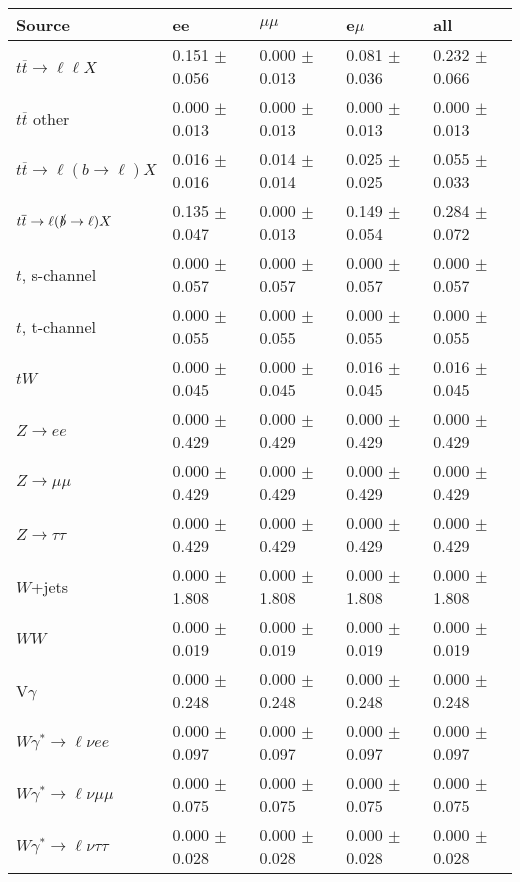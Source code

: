 \begin{tabular}{l | l l l l}
\hline\hline
 Source  &  ee  &  $\mu\mu$  &  e$\mu$  &  all \\
\hline
$t\overline{t}\rightarrow \ell\ell X$ &  0.151 $\pm$  0.056 &  0.000 $\pm$  0.013 &  0.081 $\pm$  0.036 &  0.232 $\pm$  0.066\\
$t\overline{t}$ other &  0.000 $\pm$  0.013 &  0.000 $\pm$  0.013 &  0.000 $\pm$  0.013 &  0.000 $\pm$  0.013\\
$t\overline{t}\rightarrow \ell(b\rightarrow \ell)X$ &  0.016 $\pm$  0.016 &  0.014 $\pm$  0.014 &  0.025 $\pm$  0.025 &  0.055 $\pm$  0.033\\
$t\overline{t}\rightarrow \ell(\slashed{b}\rightarrow \ell)X$ &  0.135 $\pm$  0.047 &  0.000 $\pm$  0.013 &  0.149 $\pm$  0.054 &  0.284 $\pm$  0.072\\
\hline
$t$, s-channel &  0.000 $\pm$  0.057 &  0.000 $\pm$  0.057 &  0.000 $\pm$  0.057 &  0.000 $\pm$  0.057\\
$t$, t-channel &  0.000 $\pm$  0.055 &  0.000 $\pm$  0.055 &  0.000 $\pm$  0.055 &  0.000 $\pm$  0.055\\
$tW$ &  0.000 $\pm$  0.045 &  0.000 $\pm$  0.045 &  0.016 $\pm$  0.045 &  0.016 $\pm$  0.045\\
\hline
$Z\rightarrow ee$ &  0.000 $\pm$  0.429 &  0.000 $\pm$  0.429 &  0.000 $\pm$  0.429 &  0.000 $\pm$  0.429\\
$Z\rightarrow\mu\mu$ &  0.000 $\pm$  0.429 &  0.000 $\pm$  0.429 &  0.000 $\pm$  0.429 &  0.000 $\pm$  0.429\\
$Z\rightarrow\tau\tau$ &  0.000 $\pm$  0.429 &  0.000 $\pm$  0.429 &  0.000 $\pm$  0.429 &  0.000 $\pm$  0.429\\
$W$+jets &  0.000 $\pm$  1.808 &  0.000 $\pm$  1.808 &  0.000 $\pm$  1.808 &  0.000 $\pm$  1.808\\
$WW$ &  0.000 $\pm$  0.019 &  0.000 $\pm$  0.019 &  0.000 $\pm$  0.019 &  0.000 $\pm$  0.019\\
\hline
V$\gamma$ &  0.000 $\pm$  0.248 &  0.000 $\pm$  0.248 &  0.000 $\pm$  0.248 &  0.000 $\pm$  0.248\\
$W\gamma^{*}\rightarrow\ell\nu e e$ &  0.000 $\pm$  0.097 &  0.000 $\pm$  0.097 &  0.000 $\pm$  0.097 &  0.000 $\pm$  0.097\\
$W\gamma^{*}\rightarrow\ell\nu\mu\mu$ &  0.000 $\pm$  0.075 &  0.000 $\pm$  0.075 &  0.000 $\pm$  0.075 &  0.000 $\pm$  0.075\\
$W\gamma^{*}\rightarrow\ell\nu\tau\tau$ &  0.000 $\pm$  0.028 &  0.000 $\pm$  0.028 &  0.000 $\pm$  0.028 &  0.000 $\pm$  0.028\\

\end{tabular}
